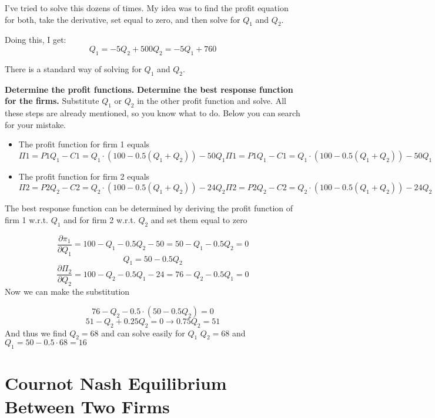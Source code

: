 \documentclass[]{report}
\begin{document}
I've tried to solve this dozens of times. My idea was to find the profit equation for both, take the derivative, set equal to zero, and then solve for $Q_1$ and $Q_2$.

Doing this, I get:
\[Q_1=−5Q_2+500 Q_2=−5Q_1+760\]



There is a standard way of solving for $Q_1$ and $Q_2$.

\textbf{Determine the profit functions.}
\textbf{Determine the best response function for the firms.}
Substitute $Q_1$ or $Q_2$ in the other profit function and solve.
All these steps are already mentioned, so you know what to do. Below you can search for your mistake.

\begin{itemize}
	\item The profit function for firm 1 equals \[Π1=P1Q_1−C1=Q_1⋅(100−0.5(Q_1+Q_2))−50Q_1Π1=P1Q_1−C1=Q_1⋅(100−0.5(Q_1+Q_2))−50Q_1\]
	\item	The profit function for firm 2 equals \[Π2=P2Q_2−C2=Q_2⋅(100−0.5(Q_1+Q_2))−24Q_2Π2=P2Q_2−C2=Q_2⋅(100−0.5(Q_1+Q_2))−24Q_2 \]
\end{itemize}

The best response function can be determined by deriving the profit function of firm 1 w.r.t. $Q_1$ and for firm 2 w.r.t. $Q_2$ and set them equal to zero

\[\frac{\partial \pi_1}{ \partial Q_1}=100−Q_1−0.5Q_2−50=50−Q_1−0.5Q_2=0\]
\[Q_1=50−0.5Q_2\]
\[ \frac{\partial \Pi_2 }{\partial Q_2}=100−Q_2−0.5Q_1−24=76−Q_2−0.5Q_1=0\]
Now we can make the substitution

\[76−Q_2−0.5⋅(50−0.5Q_2)=0\]
$$51−Q_2+0.25Q_2=0 \rightarrow 0.75Q_2=51$$
And thus we find $Q_2=68$ and can solve easily for $Q_1$
$Q_2=68$ and $Q_1=50−0.5⋅68=16$


\section{Cournot Nash Equilibrium Between Two Firms}
\end{document}
